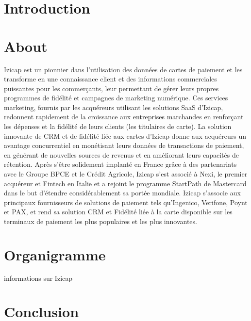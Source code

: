 
\section*{Introduction}

\section{About}
Izicap est un pionnier dans l'utilisation des données de cartes de paiement et les transforme en une connaissance client et des informations commerciales puissantes pour les commerçants, leur permettant de gérer leurs propres programmes de fidélité et campagnes de marketing numérique. 
Ces services marketing, fournis par les acquéreurs utilisant les solutions SaaS d'Izicap, redonnent rapidement de la croissance aux entreprises marchandes en renforçant les dépenses et la fidélité de leurs clients (les titulaires de carte). 
La solution innovante de CRM et de fidélité liée aux cartes d'Izicap donne aux acquéreurs un avantage concurrentiel en monétisant leurs données de transactions de paiement, en générant de nouvelles sources de revenus et en améliorant leurs capacités de rétention.
Après s'être solidement implanté en France grâce à des partenariats avec le Groupe BPCE et le Crédit Agricole, Izicap s'est associé à Nexi, le premier acquéreur et Fintech en Italie et a rejoint le programme StartPath de Mastercard dans le but d'étendre considérablement sa portée mondiale. 
Izicap s'associe aux principaux fournisseurs de solutions de paiement tels qu'Ingenico, Verifone, Poynt et PAX, et rend sa solution CRM et Fidélité liée à la carte disponible sur les terminaux de paiement les plus populaires et les plus innovantes.

\section{Organigramme}
informations sur Izicap

\section*{Conclusion}
